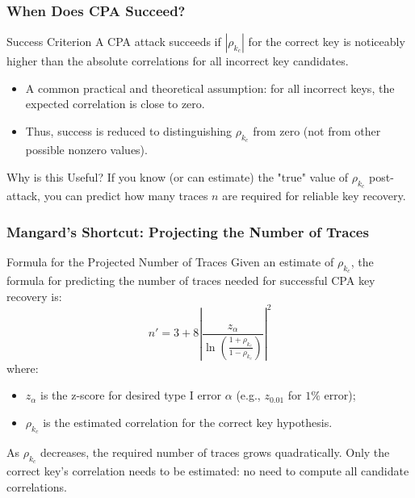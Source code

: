 \begin{frame}
    \frametitle{When Does CPA Succeed?}

    \begin{block}{Success Criterion}
        A CPA attack succeeds if $|\rho_{k_c}|$ for the correct key is noticeably higher than the absolute correlations for all incorrect key candidates.
    \end{block}

    \begin{itemize}
        \item A common practical and theoretical assumption: for all incorrect keys, the expected correlation is close to zero.
        \item Thus, success is reduced to distinguishing $\rho_{k_c}$ from zero (not from other possible nonzero values).
    \end{itemize}

    \begin{block}{Why is this Useful?}
        If you know (or can estimate) the "true" value of $\rho_{k_c}$ post-attack, you can predict how many traces $n$ are required for reliable key recovery.
    \end{block}
\end{frame}

\begin{frame}
    \frametitle{Mangard's Shortcut: Projecting the Number of Traces}

    \begin{block}{Formula for the Projected Number of Traces}
        Given an estimate of $\rho_{k_c}$, the formula for predicting the number of traces needed for successful CPA key recovery is:
        \[
        n' = 3 + 8
        \left|
            \frac{z_{\alpha}}{ \ln \left( \frac{1+\rho_{k_c}}{1-\rho_{k_c}} \right) }
        \right|^2
        \]
        where:
        \begin{itemize}
            \item $z_\alpha$ is the z-score for desired type I error $\alpha$ (e.g., $z_{0.01}$ for $1\%$ error);
            \item $\rho_{k_c}$ is the estimated correlation for the correct key hypothesis.
        \end{itemize}
    \end{block}

    
            As $\rho_{k_c}$ decreases, the required number of traces grows quadratically. \newline
             Only the correct key's correlation needs to be estimated: no need to compute all candidate correlations.
      
\end{frame}

